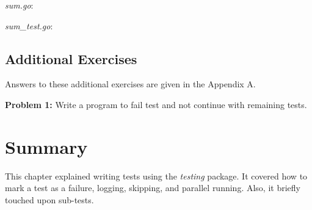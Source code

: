 \textit{sum.go}:



\textit{sum\_test.go}:



\subsection{Additional Exercises}

Answers to these additional exercises are given in the Appendix A.

\textbf{Problem 1:} Write a program to fail test and not continue with remaining tests.

\section*{Summary}

This chapter explained writing tests using the \textit{testing} package. It
covered how to mark a test as a failure, logging, skipping, and parallel
running. Also, it briefly touched upon sub-tests.
